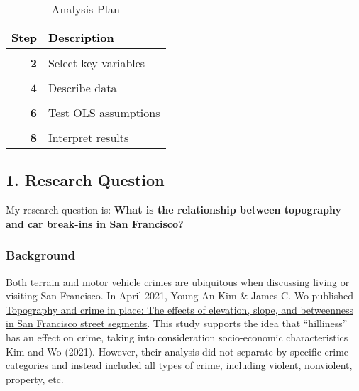 \documentclass[
]{article}
\begin{document}
\begin{table}

\caption{\label{tab:unnamed-chunk-1}Analysis Plan}
\centering
\fontsize{15}{17}\selectfont
\begin{tabular}[t]{>{}r|l}
\hline
\textcolor{black}{\textbf{Step}} & \textcolor{black}{\textbf{Description}}\\
\hline
\textbf{\cellcolor{gray!6}{1}} & \cellcolor{gray!6}{Identify research question}\\
\hline
\textbf{2} & Select key variables\\
\hline
\textbf{\cellcolor{gray!6}{3}} & \cellcolor{gray!6}{Collect data}\\
\hline
\textbf{4} & Describe data\\
\hline
\textbf{\cellcolor{gray!6}{5}} & \cellcolor{gray!6}{Visualize relationships}\\
\hline
\textbf{6} & Test OLS assumptions\\
\hline
\textbf{\cellcolor{gray!6}{7}} & \cellcolor{gray!6}{Conduct regression analysis}\\
\hline
\textbf{8} & Interpret results\\
\hline
\end{tabular}
\end{table}

\hypertarget{research-question}{%
\subsection{1. Research Question}\label{research-question}}

My research question is: \textbf{What is the relationship between
topography and car break-ins in San Francisco?}

\hypertarget{background}{%
\subsubsection{Background}\label{background}}

Both terrain and motor vehicle crimes are ubiquitous when discussing
living or visiting San Francisco. In April 2021, Young-An Kim \& James
C. Wo published
\href{https://www.tandfonline.com/doi/full/10.1080/07352166.2021.1901591}{Topography
and crime in place: The effects of elevation, slope, and betweenness in
San Francisco street segments}. This study supports the idea that
``hilliness'' has an effect on crime, taking into consideration
socio-economic characteristics Kim and Wo (2021). However, their
analysis did not separate by specific crime categories and instead
included all types of crime, including violent, nonviolent, property,
etc.
\end{document}
